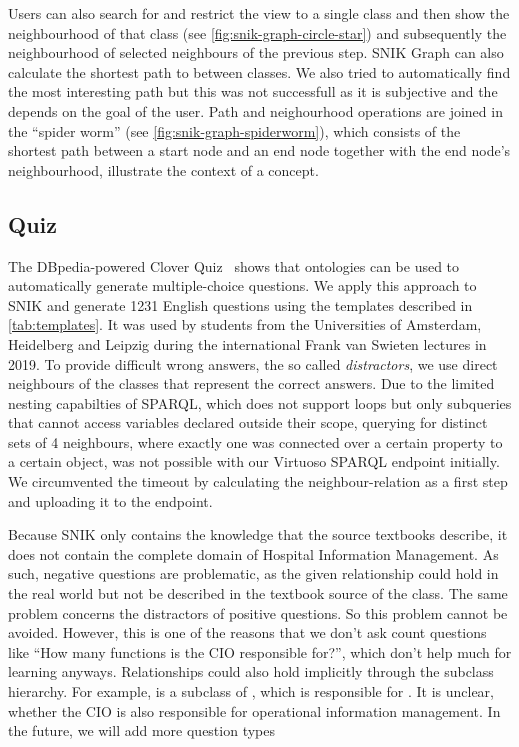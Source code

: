 \documentclass[sw]{iosart2x}
\renewcommand{\citep}{\cite}%
\begin{document}
Users can also search for and restrict the view to a single class and then show the neighbourhood of that class (see \cref{fig:snik-graph-circle-star}) and subsequently the neighbourhood of selected neighbours of the previous step.
SNIK Graph can also calculate the shortest path to between classes.
We also tried to automatically find the most interesting path but this was not successfull as it is subjective and the depends on the goal of the user.
Path and neighourhood operations are joined in the \enquote{spider worm} (see \cref{fig:snik-graph-spiderworm}), which consists of the shortest path between a start node and an end node together with the end node’s neighbourhood, illustrate the context of a concept.

\subsection{Quiz}
The DBpedia-powered Clover Quiz~\citep{cloverquiz} shows that ontologies can be used to automatically generate multiple-choice questions.
We apply this approach to SNIK and generate 1231 English questions using the templates described in \cref{tab:templates}.
It was used by students from the Universities of Amsterdam, Heidelberg and Leipzig during the international Frank van Swieten lectures in 2019.
To provide difficult wrong answers, the so called \emph{distractors}, we use direct neighbours of the classes that represent the correct answers.
Due to the limited nesting capabilties of SPARQL, which does not support loops but only subqueries that cannot access variables declared outside their scope, querying for distinct sets of 4 neighbours, where exactly one was connected over a certain property to a certain object, was not possible with our Virtuoso SPARQL endpoint initially.
We circumvented the timeout by calculating the neighbour-relation as a first step and uploading it to the endpoint.

Because SNIK only contains the knowledge that the source textbooks describe, it does not contain the complete domain of Hospital Information Management.
As such, negative questions are problematic, as the given relationship could hold in the real world but not be described in the textbook source of the class.
The same problem concerns the distractors of positive questions.
So this problem cannot be avoided.
However, this is one of the reasons that we don't ask count questions like \enquote{How many functions is the CIO responsible for?}, which don't help much for learning anyways. %
Relationships could also hold implicitly through the subclass hierarchy.
For example,  is a subclass of , which is responsible for .
It is unclear, whether the CIO is also responsible for operational information management.
In the future, we will add more question types 
\end{document}
